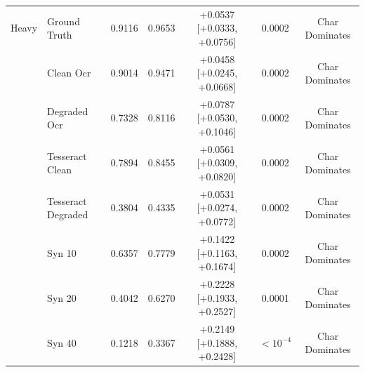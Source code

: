 \begin{table}[t]
\begin{tabular}{llccccc}
Heavy & Ground Truth & 0.9116 & 0.9653 & +0.0537 [+0.0333, +0.0756] & 0.0002 & Char Dominates \\
 & Clean Ocr & 0.9014 & 0.9471 & +0.0458 [+0.0245, +0.0668] & 0.0002 & Char Dominates \\
 & Degraded Ocr & 0.7328 & 0.8116 & +0.0787 [+0.0530, +0.1046] & 0.0002 & Char Dominates \\
 & Tesseract Clean & 0.7894 & 0.8455 & +0.0561 [+0.0309, +0.0820] & 0.0002 & Char Dominates \\
 & Tesseract Degraded & 0.3804 & 0.4335 & +0.0531 [+0.0274, +0.0772] & 0.0002 & Char Dominates \\
 & Syn 10 & 0.6357 & 0.7779 & +0.1422 [+0.1163, +0.1674] & 0.0002 & Char Dominates \\
 & Syn 20 & 0.4042 & 0.6270 & +0.2228 [+0.1933, +0.2527] & 0.0001 & Char Dominates \\
 & Syn 40 & 0.1218 & 0.3367 & +0.2149 [+0.1888, +0.2428] & $<10^{-4}$ & Char Dominates \\
\bottomrule
\end{tabular}
\end{table}
